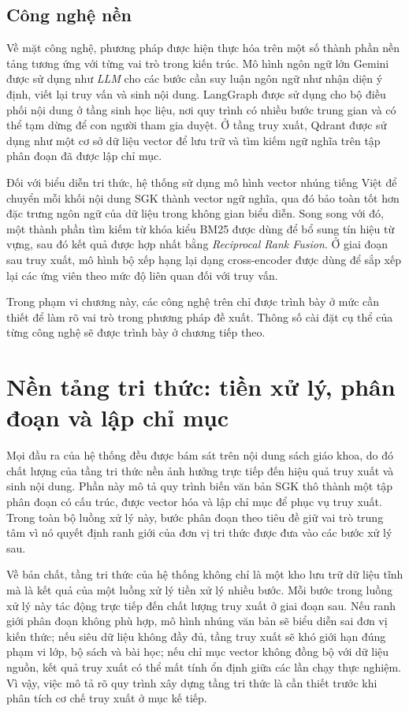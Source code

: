 \documentclass[../DoAn.tex]{subfiles}
\begin{document}
\subsection{Công nghệ nền}

Về mặt công nghệ, phương pháp được hiện thực hóa trên một số thành phần nền tảng tương ứng với từng vai trò trong kiến trúc. Mô hình ngôn ngữ lớn Gemini được sử dụng như \textit{LLM} cho các bước cần suy luận ngôn ngữ như nhận diện ý định, viết lại truy vấn và sinh nội dung. LangGraph được sử dụng cho bộ điều phối nội dung ở tầng sinh học liệu, nơi quy trình có nhiều bước trung gian và có thể tạm dừng để con người tham gia duyệt. Ở tầng truy xuất, Qdrant được sử dụng như một cơ sở dữ liệu vector để lưu trữ và tìm kiếm ngữ nghĩa trên tập phân đoạn đã được lập chỉ mục.

Đối với biểu diễn tri thức, hệ thống sử dụng mô hình vector nhúng tiếng Việt để chuyển mỗi khối nội dung SGK thành vector ngữ nghĩa, qua đó bảo toàn tốt hơn đặc trưng ngôn ngữ của dữ liệu trong không gian biểu diễn. Song song với đó, một thành phần tìm kiếm từ khóa kiểu BM25 được dùng để bổ sung tín hiệu từ vựng, sau đó kết quả được hợp nhất bằng \textit{Reciprocal Rank Fusion}. Ở giai đoạn sau truy xuất, mô hình bộ xếp hạng lại dạng cross-encoder được dùng để sắp xếp lại các ứng viên theo mức độ liên quan đối với truy vấn.

Trong phạm vi chương này, các công nghệ trên chỉ được trình bày ở mức cần thiết để làm rõ vai trò trong phương pháp đề xuất. Thông số cài đặt cụ thể của từng công nghệ sẽ được trình bày ở chương tiếp theo.

\section{Nền tảng tri thức: tiền xử lý, phân đoạn và lập chỉ mục}

Mọi đầu ra của hệ thống đều được bám sát trên nội dung sách giáo khoa, do đó chất lượng của tầng tri thức nền ảnh hưởng trực tiếp đến hiệu quả truy xuất và sinh nội dung. Phần này mô tả quy trình biến văn bản SGK thô thành một tập phân đoạn có cấu trúc, được vector hóa và lập chỉ mục để phục vụ truy xuất. Trong toàn bộ luồng xử lý này, bước phân đoạn theo tiêu đề giữ vai trò trung tâm vì nó quyết định ranh giới của đơn vị tri thức được đưa vào các bước xử lý sau.

Về bản chất, tầng tri thức của hệ thống không chỉ là một kho lưu trữ dữ liệu tĩnh mà là kết quả của một luồng xử lý tiền xử lý nhiều bước. Mỗi bước trong luồng xử lý này tác động trực tiếp đến chất lượng truy xuất ở giai đoạn sau. Nếu ranh giới phân đoạn không phù hợp, mô hình nhúng văn bản sẽ biểu diễn sai đơn vị kiến thức; nếu siêu dữ liệu không đầy đủ, tầng truy xuất sẽ khó giới hạn đúng phạm vi lớp, bộ sách và bài học; nếu chỉ mục vector không đồng bộ với dữ liệu nguồn, kết quả truy xuất có thể mất tính ổn định giữa các lần chạy thực nghiệm. Vì vậy, việc mô tả rõ quy trình xây dựng tầng tri thức là cần thiết trước khi phân tích cơ chế truy xuất ở mục kế tiếp.
\end{document}
